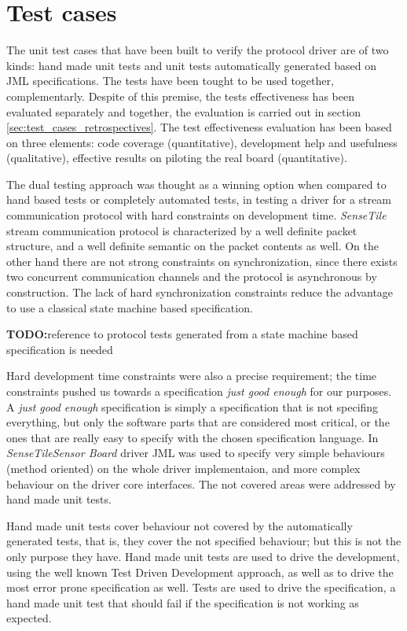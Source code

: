 \documentclass{article}
\newcommand{\todo}{\textbf{TODO:}}
\newcommand{\ST}{\emph{SenseTile}\xspace}
\newcommand{\STSB}{\ST \emph{Sensor Board}\xspace}
\begin{document}
\section{Test cases}
\label{sec:test_cases}

The unit test cases that have been built to verify the protocol driver 
are of two kinds: hand made unit tests and unit tests automatically 
generated based on JML specifications.
The tests have been tought to be used together, complementarly. 
Despite of this premise, the tests effectiveness has been evaluated 
separately and together, the evaluation is carried out in section 
\ref{sec:test_cases_retrospectives}.
The test effectiveness evaluation has been based on three elements:
code coverage (quantitative), development help and usefulness 
(qualitative), effective results on piloting the real board 
(quantitative).

The dual testing approach was thought as a winning option when 
compared to hand based tests or completely automated tests, in testing 
a driver for a stream communication protocol with hard constraints 
on development time.
\ST stream communication protocol is characterized by a well definite 
packet structure, and a well definite semantic on the packet contents 
as well.
On the other hand there are not strong constraints on synchronization, 
since there exists two concurrent communication channels and the protocol 
is asynchronous by construction.
The lack of hard synchronization constraints reduce the advantage to use 
a classical state machine based specification. 

\todo reference to protocol tests generated from a state machine based 
specification is needed

Hard development time constraints were also a precise requirement; the time 
constraints pushed us towards a specification \emph{just good enough} for
our purposes.
A \emph{just good enough} specification is simply a specification that is not 
specifing everything, but only the software parts that are considered most 
critical, or the ones that are really easy to specify with the chosen 
specification language.
In \STSB driver JML was used to specify very simple behaviours (method 
oriented) on the whole driver implementaion, and more complex behaviour on 
the driver core interfaces.
The not covered areas were addressed by hand made unit tests.

Hand made unit tests cover behaviour not covered by the automatically 
generated tests, that is, they cover the not specified behaviour; but this 
is not the only purpose they have.
Hand made unit tests are used to drive the development, using the well known 
Test Driven Development approach, as well as to drive the most error prone 
specification as well.
Tests are used to drive the specification, a hand made unit test that should 
fail if the specification is not working as expected.
\end{document}
